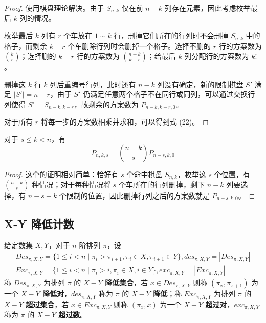\documentclass{noithesis}
\begin{document}
	\begin{proof}
		使用棋盘理论解决。由于 $S_{n,k}$ 仅在前 $n-k$ 列存在元素，因此考虑枚举最后 $k$ 列的情况。
		
		枚举最后 $k$ 列有 $r$ 个车放在 $1 \sim k$ 行，删掉它们所在的行列时不会删掉 $S_{n,k}$ 中的格子，而剩余 $k-r$ 个车删除行列时会删掉一个格子。选择不删的 $r$ 行的方案数为 $\binom{k}{r}$；选择删的 $k-r$ 行的方案数为 $\binom{n-k}{k-r}$；给最后 $k$ 列分配行的方案数为 $k!$。
		
		删掉这 $k$ 行 $k$ 列后重编号行列，此时还有 $n-k$ 列没有确定，新的限制棋盘 $S'$ 满足 $|S'| = n-r$，由于 $S'$ 仍满足任意两个格子不在同行或同列，可以通过交换行列使得 $S' = S_{n-k,k-r}$，故剩余的方案数为 $P_{n-k,k-r,0}$。
		
		对于所有 $r$ 将每一步的方案数相乘并求和，可以得到式 (22)。
	\end{proof}
	\begin{theorem}\label{kexc4}
		对于 $s \leq k< n$，有
		\begin{equation}
		P_{n,k,s} = \binom{n-k}{s} P_{n-s,k,0}
		\end{equation}
	\end{theorem}
	\begin{proof}
		这个的证明相对简单：恰好有 $s$ 个命中棋盘 $S_{n,k}$，枚举这 $s$ 个位置，有 $\binom{n-k}{s}$ 种情况；对于每种情况将 $s$ 个车所在的行列删掉，剩下 $n-k$ 列要选择，有 $n-s-k$ 个限制的位置，因此删掉行列之后的方案数就是 $P_{n-s,k,0}$。
	\end{proof}
	\subsection{X-Y 降低计数}
	\begin{definition}
		给定数集 $X,Y$，对于 $n$ 阶排列 $\pi$，设 \begin{gather*}
		Des_{\pi,X,Y} = \{1 \leq i < n \mid \pi_i > \pi_{i+1},\pi_i \in X , \pi_{i+1} \in Y\},des_{\pi,X,Y}=|Des_{\pi,X,Y}| \\
		Exc_{\pi,X,Y} = \{1 \leq i < n \mid \pi_i > i,\pi_i \in X , i \in Y\},exc_{\pi,X,Y} = |Exc_{\pi,X,Y}|
		\end{gather*}
		称 $Des_{\pi,X,Y}$ 为排列 $\pi$ 的 \textbf{$X-Y$ 降低集合}，若 $x \in Des_{\pi,X,Y}$ 则称 $(\pi_x,\pi_{x+1})$ 为一个 \textbf{$X-Y$ 降低对}，$des_{\pi,X,Y}$ 称为 $\pi$ 的 \textbf{$X-Y$ 降低}；称 $Exc_{\pi,X,Y}$ 为排列 $\pi$ 的 \textbf{$X-Y$ 超过集合}，若 $x \in Exc_{\pi,X,Y}$ 则称 $(\pi_x,x)$ 为一个 \textbf{$X-Y$ 超过对}，$exc_{\pi,X,Y}$ 称为 $\pi$ 的\textbf{ $X-Y$ 超过数}。
	\end{definition}
	
\end{document}
